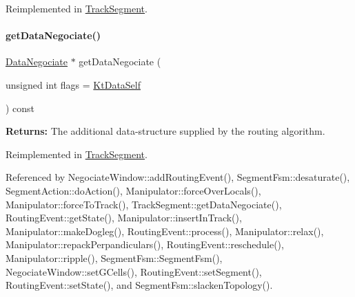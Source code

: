 Reimplemented in \mbox{\hyperlink{classKite_1_1TrackSegment_a69af7d4287bc0e44c9ca2c8e6f692be9}{Track\+Segment}}.

\mbox{\label{classKite_1_1TrackElement_acd0170a05128ec4af16ecd0060c3a3b5}} 
\paragraph{\texorpdfstring{get\+Data\+Negociate()}{getDataNegociate()}}
{\footnotesize\ttfamily \mbox{\hyperlink{classKite_1_1DataNegociate}{Data\+Negociate}} $\ast$ get\+Data\+Negociate (\begin{DoxyParamCaption}\item[{unsigned int}]{flags = {\ttfamily \mbox{\hyperlink{namespaceKite_acca8fffa3182dea5f94208f454f14b47a68e917ff37d4b5cef906303181836404}{Kt\+Data\+Self}}} }\end{DoxyParamCaption}) const\hspace{0.3cm}{\ttfamily [virtual]}}

{\bfseries Returns\+:} The additional data-\/structure supplied by the routing algorithm. 

Reimplemented in \mbox{\hyperlink{classKite_1_1TrackSegment_acd0170a05128ec4af16ecd0060c3a3b5}{Track\+Segment}}.



Referenced by Negociate\+Window\+::add\+Routing\+Event(), Segment\+Fsm\+::desaturate(), Segment\+Action\+::do\+Action(), Manipulator\+::force\+Over\+Locals(), Manipulator\+::force\+To\+Track(), Track\+Segment\+::get\+Data\+Negociate(), Routing\+Event\+::get\+State(), Manipulator\+::insert\+In\+Track(), Manipulator\+::make\+Dogleg(), Routing\+Event\+::process(), Manipulator\+::relax(), Manipulator\+::repack\+Perpandiculars(), Routing\+Event\+::reschedule(), Manipulator\+::ripple(), Segment\+Fsm\+::\+Segment\+Fsm(), Negociate\+Window\+::set\+G\+Cells(), Routing\+Event\+::set\+Segment(), Routing\+Event\+::set\+State(), and Segment\+Fsm\+::slacken\+Topology().

\mbox{\label{classKite_1_1TrackElement_af2d46d64cbd02bdbba53d5483d95e26d}} 
